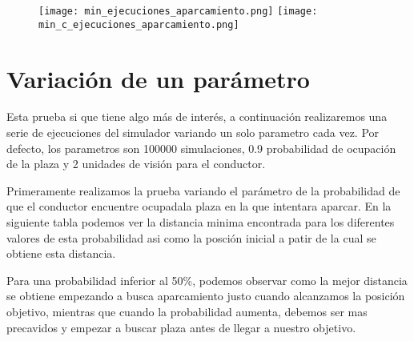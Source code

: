 \newpage

\begin{figure}[h]
\texttt{[image: min\_ejecuciones\_aparcamiento.png]}
\texttt{[image: min\_c\_ejecuciones\_aparcamiento.png]}
\centering
\end{figure}

\newpage


\section{Variación de un parámetro}
Esta prueba si que tiene algo más de interés, a continuación realizaremos una serie de ejecuciones del simulador variando un solo parametro cada vez. Por defecto, los parametros son 100000 simulaciones, 0.9 probabilidad de ocupación de la plaza y 2 unidades de visión para el conductor.

Primeramente realizamos la prueba variando el parámetro de la probabilidad de que el conductor encuentre ocupadala plaza en la que intentara aparcar. En la siguiente tabla podemos ver la distancia minima encontrada para los diferentes valores de esta probabilidad asi como la posción inicial a patir de la cual se obtiene esta distancia.

\begin{table}[h]
\centering
{}
\end{table}

Para una probabilidad inferior al 50\%, podemos observar como la mejor distancia se obtiene empezando a busca aparcamiento justo cuando alcanzamos la posición objetivo, mientras que cuando la probabilidad aumenta, debemos ser mas precavidos y empezar a buscar plaza antes de llegar a nuestro objetivo.

